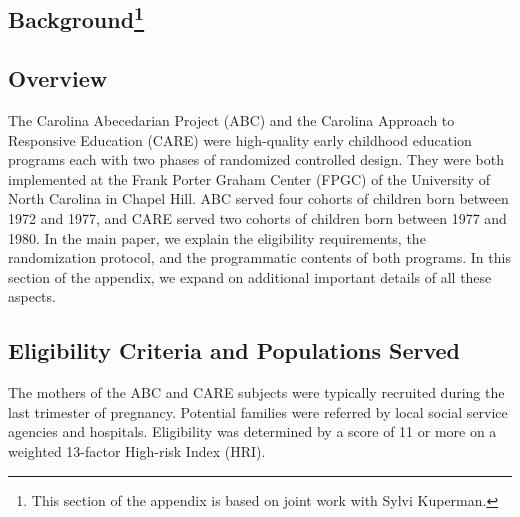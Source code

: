 \begin{appendices}
\setcounter{figure}{0}  \renewcommand{\thefigure}{A.\arabic{figure}}
\setcounter{table}{0}   \renewcommand{\thetable}{A.\arabic{table}}

\section[Background]{Background\footnote{This section of the appendix is based on joint work with Sylvi Kuperman.}} \label{appendix:background}

\subsection{Overview}

\noindent The Carolina Abecedarian Project (ABC) and the Carolina Approach to Responsive Education (CARE) were high-quality early childhood education programs each with two phases of randomized controlled design. They were both implemented at the Frank Porter Graham Center (FPGC) of the University of North Carolina in Chapel Hill. ABC served four cohorts of children born between 1972 and 1977, and CARE served two cohorts of children born between 1977 and 1980. In the main paper, we explain the eligibility requirements, the randomization protocol, and the programmatic contents of both programs. In this section of the appendix, we expand on additional important details of all these aspects.

\subsection{Eligibility Criteria and Populations Served}

\noindent The mothers of the ABC and CARE subjects were typically recruited during the last trimester  of pregnancy. Potential families were referred by local social service agencies and hospitals. Eligibility was determined by a score of 11 or more on a weighted 13-factor High-risk Index (HRI).\\ 


\end{appendices}
